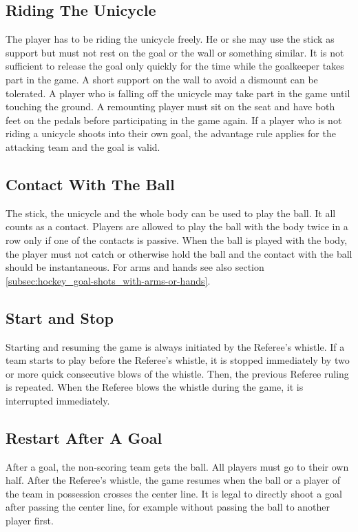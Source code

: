 \subsection{Riding The Unicycle}
The player has to be riding the unicycle freely.
He or she may use the stick as support but must not rest on the goal or the wall or something similar.
It is not sufficient to release the goal only quickly for the time while the goalkeeper takes part in the game.
A short support on the wall to avoid a dismount can be tolerated.
A player who is falling off the unicycle may take part in the game until touching the ground.
A remounting player must sit on the seat and have both feet on the pedals before participating in the game again.
If a player who is not riding a unicycle shoots into their own goal, the advantage rule applies for the attacking team and the goal is valid.

\subsection{Contact With The Ball}
The stick, the unicycle and the whole body can be used to play the ball.
It all counts as a contact.
Players are allowed to play the ball with the body twice in a row only if one of the contacts is passive.
When the ball is played with the body, the player must not catch or otherwise hold the ball and the contact with the ball should be instantaneous.
For arms and hands see also section \ref{subsec:hockey_goal-shots_with-arms-or-hands}.

\subsection{Start and Stop}
Starting and resuming the game is always initiated by the Referee's whistle.
If a team starts to play before the Referee's whistle, it is stopped immediately by two or more quick consecutive blows of the whistle.
Then, the previous Referee ruling is repeated.
When the Referee blows the whistle during the game, it is interrupted immediately.

\subsection{Restart After A Goal}
After a goal, the non-scoring team gets the ball.
All players must go to their own half.
After the Referee's whistle, the game resumes when the ball or a player of the team in possession crosses the center line.
It is legal to directly shoot a goal after passing the center line, for example without passing the ball to another player first.

